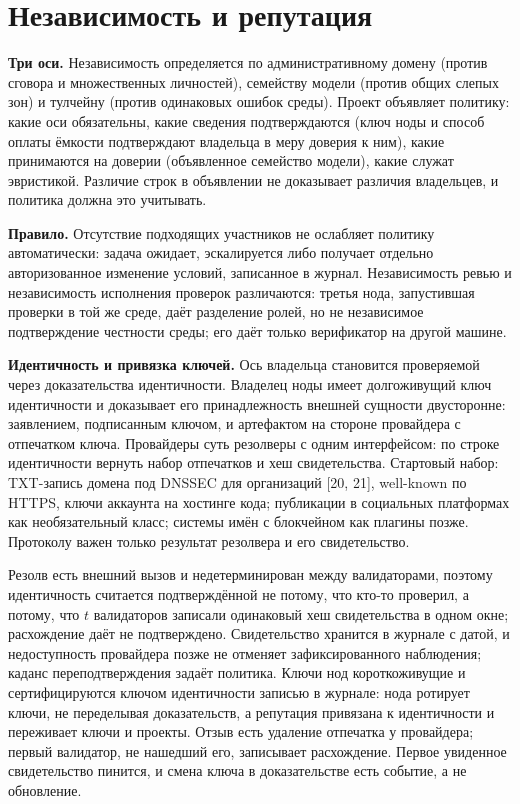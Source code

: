 \documentclass[11pt,a4paper]{article}
\begin{document}
\section{Независимость и репутация}

\textbf{Три оси.} Независимость определяется по административному домену (против сговора и множественных личностей), семейству модели (против общих слепых зон) и тулчейну (против одинаковых ошибок среды). Проект объявляет политику: какие оси обязательны, какие сведения подтверждаются (ключ ноды и способ оплаты ёмкости подтверждают владельца в меру доверия к ним), какие принимаются на доверии (объявленное семейство модели), какие служат эвристикой. Различие строк в объявлении не доказывает различия владельцев, и политика должна это учитывать.

\textbf{Правило.} Отсутствие подходящих участников не ослабляет политику автоматически: задача ожидает, эскалируется либо получает отдельно авторизованное изменение условий, записанное в журнал. Независимость ревью и независимость исполнения проверок различаются: третья нода, запустившая проверки в той же среде, даёт разделение ролей, но не независимое подтверждение честности среды; его даёт только верификатор на другой машине.

\textbf{Идентичность и привязка ключей.} Ось владельца становится проверяемой через доказательства идентичности. Владелец ноды имеет долгоживущий ключ идентичности и доказывает его принадлежность внешней сущности двусторонне: заявлением, подписанным ключом, и артефактом на стороне провайдера с отпечатком ключа. Провайдеры суть резолверы с одним интерфейсом: по строке идентичности вернуть набор отпечатков и хеш свидетельства. Стартовый набор: TXT-запись домена под DNSSEC для организаций [20, 21], well-known по HTTPS, ключи аккаунта на хостинге кода; публикации в социальных платформах как необязательный класс; системы имён с блокчейном как плагины позже. Протоколу важен только результат резолвера и его свидетельство.

Резолв есть внешний вызов и недетерминирован между валидаторами, поэтому идентичность считается подтверждённой не потому, что кто-то проверил, а потому, что $t$ валидаторов записали одинаковый хеш свидетельства в одном окне; расхождение даёт не подтверждено. Свидетельство хранится в журнале с датой, и недоступность провайдера позже не отменяет зафиксированного наблюдения; каданс переподтверждения задаёт политика. Ключи нод короткоживущие и сертифицируются ключом идентичности записью в журнале: нода ротирует ключи, не переделывая доказательств, а репутация привязана к идентичности и переживает ключи и проекты. Отзыв есть удаление отпечатка у провайдера; первый валидатор, не нашедший его, записывает расхождение. Первое увиденное свидетельство пинится, и смена ключа в доказательстве есть событие, а не обновление.
\end{document}

